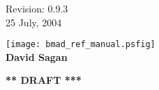 \thispagestyle{empty}

\begin{flushright}
\large
  Revision: 0.9.3 \\
  25 July, 2004 \\
\end{flushright}

\vfill

{
\begin{center}
\texttt{[image: bmad\_ref\_manual.psfig]} \\
\vskip 0.3in
\huge\bf David Sagan
\end{center}
}

\vskip 1in
\begin{center}
{\Huge \bf *** DRAFT ***}
\end{center}
\vfill
\break